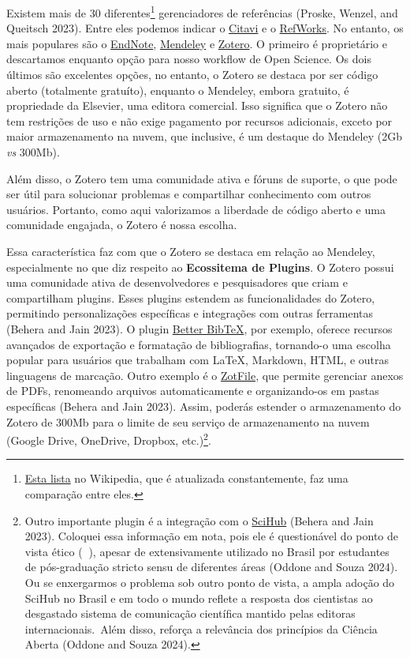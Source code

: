 \documentclass[
  a4paper,
]{article}
\begin{document}
Existem mais de 30 diferentes\footnote{\href{https://en.wikipedia.org/wiki/Comparison_of_reference_management_software}{Esta
  lista} no Wikipedia, que é atualizada constantemente, faz uma
  comparação entre eles.} gerenciadores de referências (Proske, Wenzel,
and Queitsch 2023). Entre eles podemos indicar o
\href{https://www.citavi.com/en}{Citavi} e o
\href{https://refworks.proquest.com/learn-more/}{RefWorks}. No entanto,
os mais populares são o \href{https://endnote.com/}{EndNote},
\href{https://www.mendeley.com/reference-management/reference-manager/}{Mendeley}
e \href{https://www.zotero.org/}{Zotero}. O primeiro é proprietário e
descartamos enquanto opção para nosso workflow de Open Science. Os dois
últimos são excelentes opções, no entanto, o Zotero se destaca por ser
código aberto (totalmente gratuíto), enquanto o Mendeley, embora
gratuito, é propriedade da Elsevier, uma editora comercial. Isso
significa que o Zotero não tem restrições de uso e não exige pagamento
por recursos adicionais, exceto por maior armazenamento na nuvem, que
inclusive, é um destaque do Mendeley (2Gb \emph{vs} 300Mb).

Além disso, o Zotero tem uma comunidade ativa e fóruns de suporte, o que
pode ser útil para solucionar problemas e compartilhar conhecimento com
outros usuários. Portanto, como aqui valorizamos a liberdade de código
aberto e uma comunidade engajada, o Zotero é nossa escolha.

Essa característica faz com que o Zotero se destaca em relação ao
Mendeley, especialmente no que diz respeito ao \textbf{Ecossitema de
Plugins}. O Zotero possui uma comunidade ativa de desenvolvedores e
pesquisadores que criam e compartilham plugins. Esses plugins estendem
as funcionalidades do Zotero, permitindo personalizações específicas e
integrações com outras ferramentas (Behera and Jain 2023). O plugin
\href{https://retorque.re/zotero-better-bibtex/}{Better BibTeX}, por
exemplo, oferece recursos avançados de exportação e formatação de
bibliografias, tornando-o uma escolha popular para usuários que
trabalham com LaTeX, Markdown, HTML, e outras linguagens de marcação.
Outro exemplo é o \href{https://zotfile.com/}{ZotFile}, que permite
gerenciar anexos de PDFs, renomeando arquivos automaticamente e
organizando-os em pastas específicas (Behera and Jain 2023). Assim,
poderás estender o armazenamento do Zotero de 300Mb para o limite de seu
serviço de armazenamento na nuvem (Google Drive, OneDrive, Dropbox,
etc.)\footnote{Outro importante plugin é a integração com o
  \href{https://github.com/ethanwillis/zotero-scihub}{SciHub} (Behera
  and Jain 2023). Coloquei essa informação em nota, pois ele é
  questionável do ponto de vista ético (😬🫣), apesar de extensivamente
  utilizado no Brasil por estudantes de pós-graduação stricto sensu de
  diferentes áreas (Oddone and Souza 2024). Ou se enxergarmos o problema
  sob outro ponto de vista, a ampla adoção do SciHub no Brasil e em todo
  o mundo reflete a resposta dos cientistas ao desgastado sistema de
  comunicação científica mantido pelas editoras internacionais.~Além
  disso, reforça a relevância dos princípios da Ciência Aberta (Oddone
  and Souza 2024).}.
\end{document}
